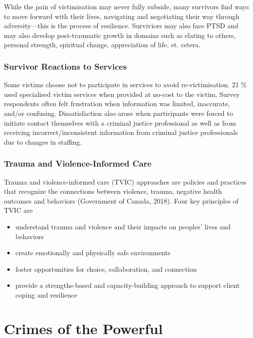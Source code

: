 \documentclass{article}
\begin{document}
While the pain of victimisation may never fully subside, many survivors find ways to move forward with their lives, navigating and negotiating their way through adversity—this is the process of resilience. Surviviors may also face PTSD and may also develop post-traumatic growth in domains such as elating to others, personal strength, spiritual change, appreciation of life, et. cetera.

\subsubsection*{Survivor Reactions to Services}

Some victims choose not to participate in services to avoid re-victimisation. 21 \% used specialised victim services when provided at no-cost to the victim.  Survey respondents often felt frustration when information was limited, inaccurate, and/or confusing. Dissatisfaction also arose when participants were forced to initiate contact themselves with a criminal justice professional as well as from receiving incorrect/inconsistent information from criminal justice professionals due to changes in staffing.

\subsubsection*{Trauma and Violence-Informed Care}

Trauma and violence-informed care (TVIC) approaches are policies and practices that recognize the connections between violence, trauma, negative health outcomes and behaviors (Government of Canada, 2018). Four key principles of TVIC are

\begin{itemize}
    \item understand trauma and violence and their impacts on peoples’ lives and behaviors
    \item create emotionally and physically safe environments
    \item foster opportunities for choice, collaboration, and connection
    \item provide a strengths-based and capacity-building approach to support client coping and resilience
\end{itemize}

\section{Crimes of the Powerful}
\end{document}
